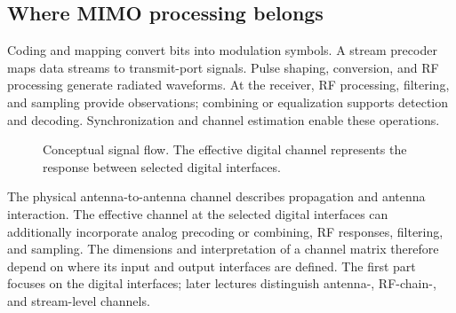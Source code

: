 \subsection{Where MIMO processing belongs}
Coding and mapping convert bits into modulation symbols. A stream precoder maps data streams to transmit-port signals. Pulse shaping, conversion, and RF processing generate radiated waveforms. At the receiver, RF processing, filtering, and sampling provide observations; combining or equalization supports detection and decoding. Synchronization and channel estimation enable these operations.
\begin{figure}[ht]
\centering
{}
\caption{Conceptual signal flow. The effective digital channel represents the response between selected digital interfaces.}
\end{figure}

The physical antenna-to-antenna channel describes propagation and antenna interaction. The effective channel at the selected digital interfaces can additionally incorporate analog precoding or combining, RF responses, filtering, and sampling. The dimensions and interpretation of a channel matrix therefore depend on where its input and output interfaces are defined. The first part focuses on  the digital interfaces; later lectures distinguish antenna-, RF-chain-, and stream-level channels.

